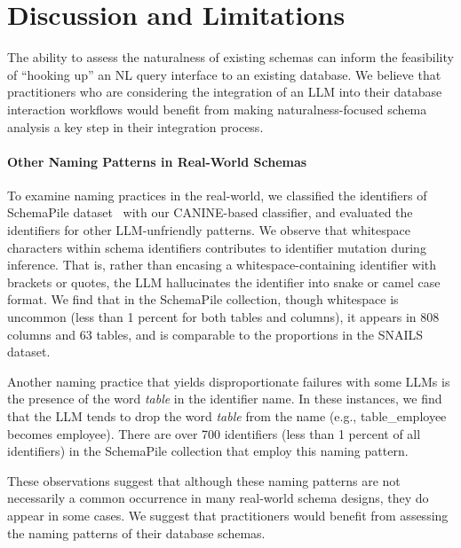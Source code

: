 \section{Discussion and Limitations}


The ability to assess the naturalness of existing schemas can inform the feasibility of ``hooking up'' an NL query interface to an existing database.
We believe that practitioners who are considering the integration of an LLM into their database interaction workflows would benefit from making naturalness-focused schema analysis a key step in their integration process.

\paragraph{\textbf{Other Naming Patterns in Real-World Schemas}}
To examine naming practices in the real-world, we classified the identifiers of SchemaPile dataset~\cite{doehmen2024schemapile} with our CANINE-based classifier, and evaluated the identifiers for other LLM-unfriendly patterns.
We observe that whitespace characters within schema identifiers contributes to identifier mutation during inference.
That is, rather than encasing a whitespace-containing identifier with brackets or quotes, the LLM hallucinates the identifier into snake or camel case format.
We find that in the SchemaPile collection, though whitespace is uncommon (less than 1 percent for both tables and columns), it appears in 808 columns and 63 tables, and is comparable to the proportions in the SNAILS dataset.

Another naming practice that yields disproportionate failures with some LLMs is the presence of the word \emph{table} in the identifier name.
In these instances, we find that the LLM tends to drop the word \emph{table} from the name (e.g., table\_employee becomes employee).
There are over 700 identifiers (less than 1 percent of all identifiers) in the SchemaPile collection that employ this naming pattern.

These observations suggest that although these naming patterns are not necessarily a common occurrence in many real-world schema designs, they do appear in some cases. 
We suggest that practitioners would benefit from assessing the naming patterns of their database schemas.


